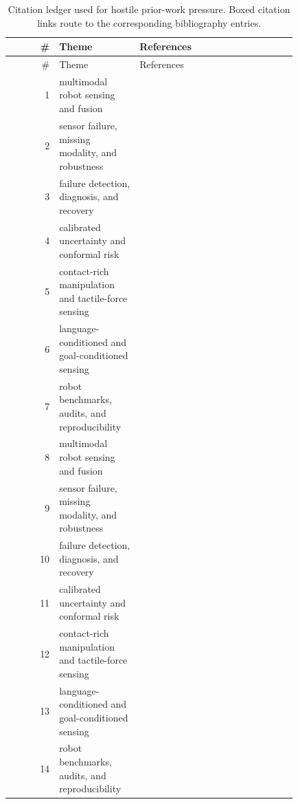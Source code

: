 \documentclass{article}
\begin{document}
\begin{longtable}{@{}r p{0.28\linewidth} p{0.55\linewidth}@{}}
\caption{Citation ledger used for hostile prior-work pressure. Boxed citation links route to the corresponding bibliography entries.}\\
\toprule
\# & Theme & References\\
\midrule
\endfirsthead
\toprule
\# & Theme & References\\
\midrule
\endhead
1 & multimodal robot sensing and fusion & \citep{narkhede2021gas1,loo2022robust2,khanna2025reflex3} \\
2 & sensor failure, missing modality, and robustness & \citep{betancourt2023robust4,zhao2025polytouch5,fan2025magicgripper6} \\
3 & failure detection, diagnosis, and recovery & \citep{patel2019a7,inceoglu2023multimodal8,neves2023endtoend9} \\
4 & calibrated uncertainty and conformal risk & \citep{zhang2026fewshot10,lee2023abaxial11,wang2024multimodal12} \\
5 & contact-rich manipulation and tactile-force sensing & \citep{yang2024computational13,liu2022learning14,kim2024mechanically15} \\
6 & language-conditioned and goal-conditioned sensing & \citep{zhao2024augmented16,dai2023soft17,liemhetcharat2013forming18} \\
7 & robot benchmarks, audits, and reproducibility & \citep{hashimoto2002sensor19,zheng2023autofed20,kubelka2015robust21} \\
8 & multimodal robot sensing and fusion & \citep{mulubika2025an22,vijayaraghavan2025development23,ciuffreda2023a24} \\
9 & sensor failure, missing modality, and robustness & \citep{fard2025bayesian25,kalenberg2024stargate26,pruski2000sensor27} \\
10 & failure detection, diagnosis, and recovery & \citep{haider2022robust28,li2025focers29,majumdar2017funnel30} \\
11 & calibrated uncertainty and conformal risk & \citep{pu2025an31,thuruthel2019soft32,ehatishamulhaq2019robust33} \\
12 & contact-rich manipulation and tactile-force sensing & \citep{kaymak2023development34,huang2025how35,wang2025mobile36} \\
13 & language-conditioned and goal-conditioned sensing & \citep{zou2022eventhd37,uhm2022design38,lee2025mins39} \\
14 & robot benchmarks, audits, and reproducibility & \citep{wang2021when40,din2017a41,thakur2025multimodal42} \\

\end{longtable}
\end{document}
